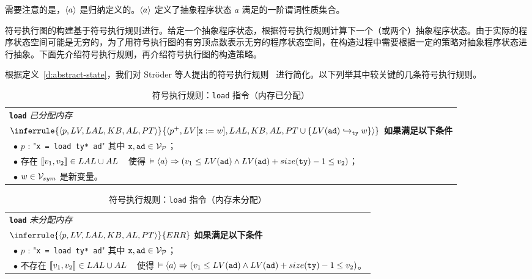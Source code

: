 需要注意的是，$\langle a\rangle$ 是归纳定义的。$\langle a \rangle$ 定义了抽象程序状态 $a$ 满足的一阶谓词性质集合。

符号执行图的构建基于符号执行规则进行。给定一个抽象程序状态，根据符号执行规则计算下一个（或两个）抽象程序状态。由于实际的程序状态空间可能是无穷的，为了用符号执行图的有穷顶点数表示无穷的程序状态空间，在构造过程中需要根据一定的策略对抽象程序状态进行抽象。下面先介绍符号执行规则，再介绍符号执行图的构造策略。

根据定义~\ref{d:abstract-state}，我们对 Str\"oder 等人提出的符号执行规则~\cite{DBLP:journals/jar/StroderGBFFHSA17} 进行简化。以下列举其中较关键的几条符号执行规则。


\begin{table}[htbp]
\caption{符号执行规则：\texttt{load} 指令（内存已分配）}
\label{tab:rule-load-alloc}
\begin{tabularx}{\textwidth}{|X|}
\hline
\textbf{\texttt{load}} \emph{已分配内存} \\
{\centering $
\inferrule
   {\lb p, LV, LAL, KB, AL, PT\rb}
   {\lb p^+, LV[\texttt{x}:= w], LAL, KB, AL, PT\cup\{LV(\texttt{ad})\pta_{\ty} w \}\rb }
$ \\}
\textbf{如果满足以下条件} \\
~$\bullet$ $p$ : "\texttt{x = load ty* ad}" 其中 $\texttt{x},\texttt{ad}\in\mathcal{V}_{\mathcal{P}}$； \\
~$\bullet$ 存在 $\llbracket v_1,v_2 \rrbracket\in LAL\cup AL$ \newline 
~\phantom{$\bullet$ } 使得 $\vDash \langle a\rangle \Rightarrow (v_1\le LV(\texttt{ad}) \land LV(\texttt{ad}) + size(\texttt{ty})-1\le v_2)$；  \\
~$\bullet$ $w\in\mathcal{V}_{sym}$ 是新变量。 \\
\hline
\end{tabularx}
\end{table}

\begin{table}[htbp]
\caption{符号执行规则：\texttt{load} 指令（内存未分配）}
\label{tab:rule-load-unalloc}
\begin{tabularx}{\textwidth}{|X|}
\hline
\textbf{\texttt{load}} \emph{未分配内存} \\
{\centering $
\inferrule
   {\lb p, LV, LAL, KB, AL, PT\rb}
   {ERR}
$ \\}
\textbf{如果满足以下条件} \\
~$\bullet$ $p$ : "\texttt{x = load ty* ad}" 其中 $\texttt{x},\texttt{ad}\in\mathcal{V}_{\mathcal{P}}$； \\
~$\bullet$ 不存在 $\llbracket v_1,v_2 \rrbracket\in LAL\cup AL$ \newline 
~\phantom{$\bullet$ } 使得 $\vDash \langle a\rangle \Rightarrow (v_1\le LV(\texttt{ad}) \land LV(\texttt{ad}) + size(\texttt{ty})-1\le v_2)$。  \\
\hline
\end{tabularx}
\end{table}

